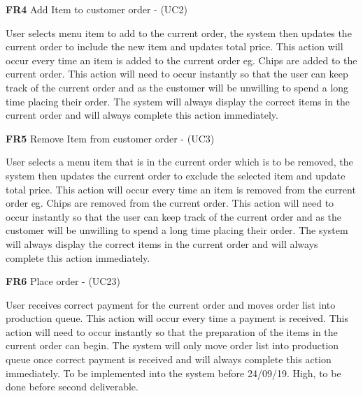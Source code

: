 \noindent \textbf{FR4} Add Item to customer order -  (UC2)\\
\begin{small}
	User selects menu item to add to the current order, the system then updates the current order to include the new item and updates total price. This action will occur every time an item is added to the current order eg. Chips are added to the current order. This action will need to occur instantly so that the user can keep track of the current order and as the customer will be unwilling to spend a long time placing their order. The system will always display the correct items in the current order and will always complete this action immediately. \\
\end{small}
\linebreak

\noindent \textbf{FR5} Remove Item from customer order -  (UC3)\\
\begin{small}
	User selects a menu item that is in the current order which is to be removed,  the system then updates the current order to exclude the selected item and update total price. This action will occur every time an item is removed from  the current order eg. Chips are removed from  the current order. This action will need to occur instantly so that the user can keep track of the current order and as the customer will be unwilling to spend a long time placing their order. The system will always display the correct items in the current order and will always complete this action immediately.\\
\end{small}
\linebreak

\noindent \textbf{FR6} Place order - (UC23)\\
\begin{small}
	User receives correct payment for the current order and moves order list into production queue. This action will occur every time a payment is received. This action will need to occur instantly so that the preparation of the items in the current order can begin. The system will only move order list into production queue once correct payment is received and will always complete this action immediately. To be implemented into the system before 24/09/19.
	High, to be done before second deliverable.\\
\end{small}
\linebreak






